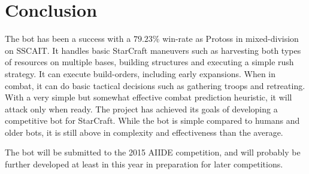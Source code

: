 \chapter{Conclusion}
The bot has been a success with a $79.23\%$ win-rate as Protoss in mixed-division on SSCAIT. It handles basic StarCraft maneuvers such as harvesting both types of resources on multiple bases, building structures and executing a simple rush strategy. It can execute build-orders, including early expansions. When in combat, it can do basic tactical decisions such as gathering troops and retreating. With a very simple but somewhat effective combat prediction heuristic, it will attack only when ready. The project has achieved its goals of developing a competitive bot for StarCraft. While the bot is simple compared to humans and older bots, it is still above in complexity and effectiveness than the average.

The bot will be submitted to the 2015 AIIDE competition, and will probably be further developed at least in this year in preparation for later competitions.